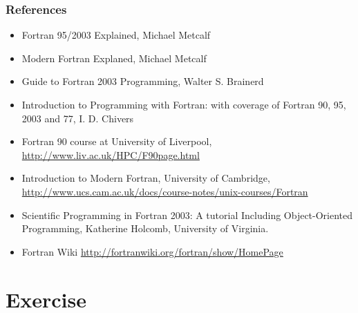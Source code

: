 \documentclass[10pt,t]{beamer}
\begin{document}
%


\begin{frame}
  \frametitle{\small References}
  \begin{itemize}
    \item Fortran 95/2003 Explained, Michael Metcalf
    \item Modern Fortran Explaned, Michael Metcalf
    \item Guide to Fortran 2003 Programming, Walter S. Brainerd
    \item Introduction to Programming with Fortran: with coverage of Fortran 90, 95, 2003 and 77, I. D. Chivers
    \item Fortran 90 course at University of Liverpool, \url{http://www.liv.ac.uk/HPC/F90page.html}
    \item Introduction to Modern Fortran, University of Cambridge, \url{http://www.ucs.cam.ac.uk/docs/course-notes/unix-courses/Fortran}
    \item Scientific Programming in Fortran 2003: A tutorial Including Object-Oriented Programming, Katherine Holcomb, University of Virginia.
    \item Fortran Wiki \url{http://fortranwiki.org/fortran/show/HomePage}
  \end{itemize}
\end{frame}


\section{Exercise}
\end{document}
